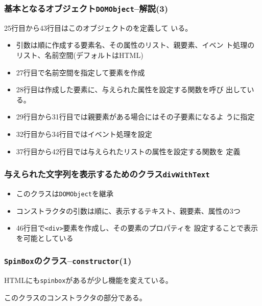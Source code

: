  \begin{frame}[containsverbatim]
  \frametitle{基本となるオブジェクト\texttt{DOMObject}--解説(3)}
 25行目から43行目はこのオブジェクトのを定義して
       いる。
       \begin{itemize}
        \item 引数は順に作成する要素名、その属性のリスト、親要素、イベン
              ト処理のリスト、名前空間(デフォルトはHTML)
        \item 27行目で名前空間を指定して要素を作成
        \item 28行目は作成した要素に、与えられた属性を設定する関数を呼び
              出している。
        \item 29行目から31行目では親要素がある場合にはその子要素になるよ
              うに指定
        \item 32行目から34行目ではイベント処理を設定
        \item 37行目から42行目では与えられたリストの属性を設定する関数を
              定義
       \end{itemize}
 \end{frame}
 \begin{frame}[containsverbatim]
  \frametitle{与えられた文字列を表示するためのクラス\texttt{divWithText}}
\begin{itemize}
 \item このクラスは\texttt{DOMObject}を継承
 \item コンストラクタの引数は順に、表示するテキスト、親要素、属性の3つ
 \item 46行目で\texttt{<div>}要素を作成し、その要素のプロパティを
       設定することで表示を可能としている
\end{itemize}
 \end{frame}
 \begin{frame}[containsverbatim]
  \frametitle{\texttt{SpinBox}のクラス--\texttt{constructor}(1)}
HTMLにも\texttt{spinbox}があるが少し機能を変えている。

  このクラスのコンストラクタの部分である。
 \end{frame}
